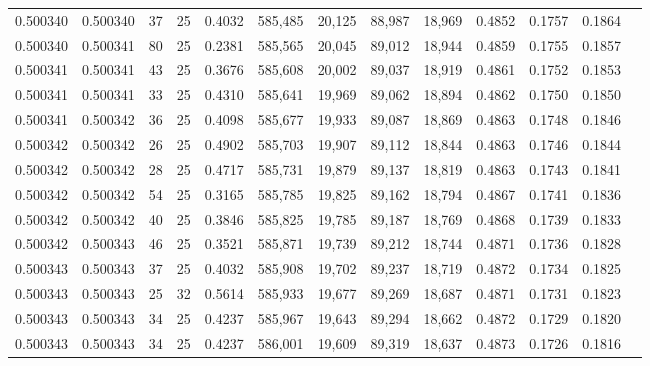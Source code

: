 \begin{tabular}{rrrrrrrrrrrrr}
0.500340 & 0.500340 &    37 &  25 &                                     0.4032 & 585,485 &  20,125 &  88,987 &  18,969 & 0.4852 & 0.1757 & 0.1864 \\
0.500340 & 0.500341 &    80 &  25 &                                     0.2381 & 585,565 &  20,045 &  89,012 &  18,944 & 0.4859 & 0.1755 & 0.1857 \\
0.500341 & 0.500341 &    43 &  25 &                                     0.3676 & 585,608 &  20,002 &  89,037 &  18,919 & 0.4861 & 0.1752 & 0.1853 \\
0.500341 & 0.500341 &    33 &  25 &                                     0.4310 & 585,641 &  19,969 &  89,062 &  18,894 & 0.4862 & 0.1750 & 0.1850 \\
0.500341 & 0.500342 &    36 &  25 &                                     0.4098 & 585,677 &  19,933 &  89,087 &  18,869 & 0.4863 & 0.1748 & 0.1846 \\
0.500342 & 0.500342 &    26 &  25 &                                     0.4902 & 585,703 &  19,907 &  89,112 &  18,844 & 0.4863 & 0.1746 & 0.1844 \\
0.500342 & 0.500342 &    28 &  25 &                                     0.4717 & 585,731 &  19,879 &  89,137 &  18,819 & 0.4863 & 0.1743 & 0.1841 \\
0.500342 & 0.500342 &    54 &  25 &                                     0.3165 & 585,785 &  19,825 &  89,162 &  18,794 & 0.4867 & 0.1741 & 0.1836 \\
0.500342 & 0.500342 &    40 &  25 &                                     0.3846 & 585,825 &  19,785 &  89,187 &  18,769 & 0.4868 & 0.1739 & 0.1833 \\
0.500342 & 0.500343 &    46 &  25 &                                     0.3521 & 585,871 &  19,739 &  89,212 &  18,744 & 0.4871 & 0.1736 & 0.1828 \\
0.500343 & 0.500343 &    37 &  25 &                                     0.4032 & 585,908 &  19,702 &  89,237 &  18,719 & 0.4872 & 0.1734 & 0.1825 \\
0.500343 & 0.500343 &    25 &  32 &                                     0.5614 & 585,933 &  19,677 &  89,269 &  18,687 & 0.4871 & 0.1731 & 0.1823 \\
0.500343 & 0.500343 &    34 &  25 &                                     0.4237 & 585,967 &  19,643 &  89,294 &  18,662 & 0.4872 & 0.1729 & 0.1820 \\
0.500343 & 0.500343 &    34 &  25 &                                     0.4237 & 586,001 &  19,609 &  89,319 &  18,637 & 0.4873 & 0.1726 & 0.1816 \\

\end{tabular}
